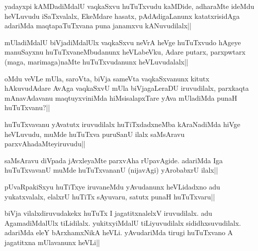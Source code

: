 \begin{artha}
yadayxpi kAMDadiMdalU vaqkaSxvu huTuTxvudu kaMDide, adharaMte ideMdu heVLuvudu iSaTxvalalx, EkeMdare hasatx, pAdAdigaLanunx katatxrisidAga adariMda maqtapaTuTxvana puna janamxvu kANuvudilalx||
\end{artha}


\begin{artha}%
mUladiMdalU biVjadiMdalUlx vaqkaSxvu neVrA heVge huTuTxvudo hAgeye manuSayxnu huTuTxvaneMbudanunx heVLabeVku, Adare putarx, parxpwtarx (maga, marimaga)naMte huTuTxvudanunx heVLuvudalalx||
\end{artha}


\begin{artha}
oMdu veVLe mUla, saroVta, biVja sameVta vaqkaSxvanunx kitutx hAkuvudAdare AvAga vaqkaSxvU mUla biVjagaLeraDU iruvudilalx, parxkaqta mAnavAdavanu maqtuyxviniMda hiMsisalapxTare yAva mUladiMda punaH huTuTxvanu?||
\end{artha}


\begin{artha}
huTuTxvavanu yAvatutx iruvudilalx huTiTxdadxneMba kAraNadiMda hiVge heVLuvudu, muMde huTuTxva puruSanU ilalx saMsAravu parxvAhadaMteyiruvudu||
\end{artha}

\begin{artha}
saMsAravu diVpada jAvxleyaMte parxvAha rUpavAgide. adariMda Iga huTuTxvavanU muMde huTuTxvananU (nijavAgi) yArobabxrU ilalx||
\end{artha}%


\begin{artha}
pUvaRpakiSxyu huTiTxye iruvaneMdu yAvudanunx heVLidadxno adu yukatxvalalx, elalxrU huTiTx sAyuvaru, satutx punaH huTuTxvaru||
\end{artha}


\begin{artha}
biVja vilalxdiruvudakekx huTuTx I jagatitxnalelxV iruvudilalx. adu AgamadiMdalUlx tiLidilalx. yukitxyiMdalU tiLiyuvudilalx sididhxsuvudilalx. adariMda eleY bArxhamxNikA heVLi. yAvudariMda tirugi huTuTxvano A jagatitxna mUlavanunx heVLi||
\end{artha}

